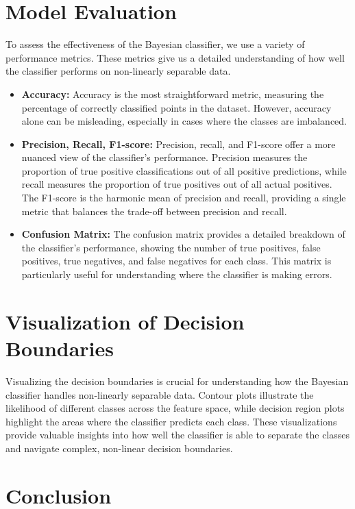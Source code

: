 \documentclass[conference]{IEEEtran}
\begin{document}
	\section{Model Evaluation}
	
	To assess the effectiveness of the Bayesian classifier, we use a variety of performance metrics. These metrics give us a detailed understanding of how well the classifier performs on non-linearly separable data.
	
	\begin{itemize}
		\item \textbf{Accuracy:} Accuracy is the most straightforward metric, measuring the percentage of correctly classified points in the dataset. However, accuracy alone can be misleading, especially in cases where the classes are imbalanced.
		\item \textbf{Precision, Recall, F1-score:} Precision, recall, and F1-score offer a more nuanced view of the classifier’s performance. Precision measures the proportion of true positive classifications out of all positive predictions, while recall measures the proportion of true positives out of all actual positives. The F1-score is the harmonic mean of precision and recall, providing a single metric that balances the trade-off between precision and recall.
		\item \textbf{Confusion Matrix:} The confusion matrix provides a detailed breakdown of the classifier’s performance, showing the number of true positives, false positives, true negatives, and false negatives for each class. This matrix is particularly useful for understanding where the classifier is making errors.
	\end{itemize}
	
	\section{Visualization of Decision Boundaries}
	
	Visualizing the decision boundaries is crucial for understanding how the Bayesian classifier handles non-linearly separable data. Contour plots illustrate the likelihood of different classes across the feature space, while decision region plots highlight the areas where the classifier predicts each class. These visualizations provide valuable insights into how well the classifier is able to separate the classes and navigate complex, non-linear decision boundaries.
	

\section{Conclusion}
\end{document}
